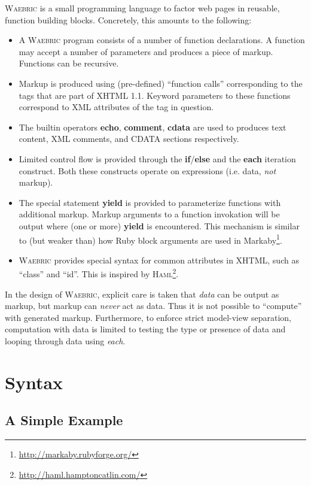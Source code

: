 \documentclass[a4paper]{article}
\def\waebric{\textsc{Waebric}\xspace}
\begin{document}
\waebric is a small programming language to factor web pages in
reusable, function building blocks. Concretely, this amounts to the
following:
\begin{itemize}
\item A \waebric program consists of a number of function
  declarations. A function may accept a number of parameters and
  produces a piece of markup. Functions can be recursive.
\item Markup is produced using (pre-defined) ``function calls''
  corresponding to the tags that are part of XHTML 1.1. Keyword
  parameters to these functions correspond to XML attributes of the
  tag in question.
\item The builtin operators \textbf{echo}, \textbf{comment},
  \textbf{cdata} are used to produces text content, XML comments, and
  CDATA sections respectively.
\item Limited control flow is provided through the
  \textbf{if}/\textbf{else} and the \textbf{each} iteration
  construct. Both these constructs operate on expressions (i.e. data,
  \textit{not} markup).
\item The special statement \textbf{yield} is provided to parameterize
  functions with additional markup. Markup arguments to a function
  invokation will be output where (one or more) \textbf{yield} is
  encountered. This mechanism is similar to (but weaker than) how Ruby
  block arguments are used in Markaby\footnote{\url{http://markaby.rubyforge.org/}}.
\item \waebric provides special syntax for common attributes in XHTML,
  such as ``class'' and ``id''. This is inspired by
  \textsc{Haml}\footnote{\url{http://haml.hamptoncatlin.com/}}.
\end{itemize}

In the design of \waebric, explicit care is taken that \textit{data}
can be output as markup, but markup can \textit{never} act as
data. Thus it is not possible to ``compute'' with generated
markup. Furthermore, to enforce strict model-view separation,
computation with data is limited to testing the type or presence of
data and looping through data using \textit{each}.


\section{Syntax}

\subsection{A Simple Example}
\end{document}
